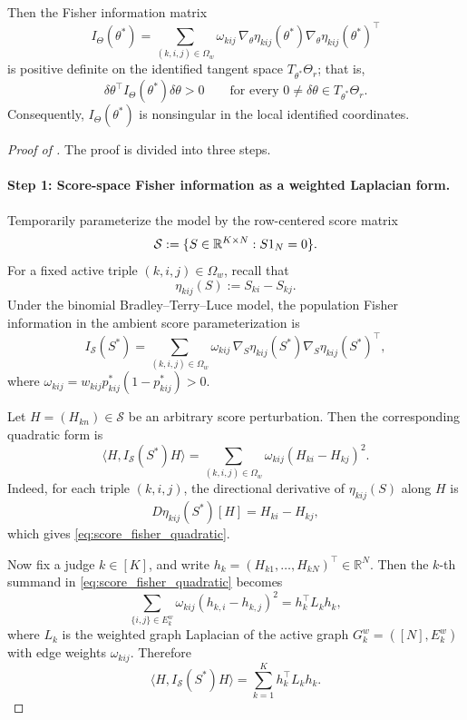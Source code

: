 \documentclass{article}
\begin{document}
\begin{bibunit}[unsrtnat]
\begin{proposition}
    Then the Fisher information matrix
    \[
    I_{\Theta}(\theta^*)
    =
    \sum_{(k,i,j)\in\Omega_w}
    \omega_{kij}\,
    \nabla_\theta \eta_{kij}(\theta^*)
    \nabla_\theta \eta_{kij}(\theta^*)^\top
    \]
    is positive definite on the identified tangent space \(T_{\theta^*}\Theta_r\); that is,
    \[
    \delta\theta^\top I_{\Theta}(\theta^*)\delta\theta>0
    \qquad
    \text{for every }0\neq \delta\theta\in T_{\theta^*}\Theta_r.
    \]
    Consequently, \(I_\Theta(\theta^*)\) is nonsingular in the local identified coordinates.
\end{proposition}

\begin{proof}[Proof of ]
The proof is divided into three steps.

\paragraph{Step 1: Score-space Fisher information as a weighted Laplacian form.}
Temporarily parameterize the model by the row-centered score matrix
\[
\mathcal S:=\{S\in\mathbb R^{K\times N}:S1_N=0\}.
\]
For a fixed active triple \((k,i,j)\in\Omega_w\), recall that
\[
\eta_{kij}(S):=S_{ki}-S_{kj}.
\]
Under the binomial Bradley--Terry--Luce model, the population Fisher information in the ambient score parameterization is
\[
I_{\mathcal S}(S^*)
=
\sum_{(k,i,j)\in\Omega_w}
\omega_{kij}\,
\nabla_S \eta_{kij}(S^*)
\nabla_S \eta_{kij}(S^*)^\top,
\]
where \(\omega_{kij}=w_{kij}p_{kij}^*(1-p_{kij}^*)>0\).

Let \(H=(H_{kn})\in\mathcal S\) be an arbitrary score perturbation. Then the corresponding quadratic form is
\begin{equation}
\label{eq:score_fisher_quadratic}
\langle H, I_{\mathcal S}(S^*)H\rangle=\sum_{(k,i,j)\in\Omega_w}\omega_{kij}(H_{ki}-H_{kj})^2.
\end{equation}
Indeed, for each triple \((k,i,j)\), the directional derivative of \(\eta_{kij}(S)\) along \(H\) is
\[
D\eta_{kij}(S^*)[H]=H_{ki}-H_{kj},
\]
which gives \eqref{eq:score_fisher_quadratic}.

Now fix a judge \(k\in[K]\), and write \(h_k=(H_{k1},\dots,H_{kN})^\top\in\mathbb R^N\).
Then the \(k\)-th summand in \eqref{eq:score_fisher_quadratic} becomes
\[
\sum_{\{i,j\}\in E_k^w}\omega_{kij}(h_{k,i}-h_{k,j})^2=h_k^\top L_k h_k,
\]
where \(L_k\) is the weighted graph Laplacian of the active graph \(G_k^w=([N],E_k^w)\) with edge weights \(\omega_{kij}\). Therefore
\begin{equation}
\label{eq:block_laplacian_decomp}
\langle H, I_{\mathcal S}(S^*)H\rangle
=
\sum_{k=1}^K h_k^\top L_k h_k.
\end{equation}


\end{proof}
\end{bibunit}
\end{document}
